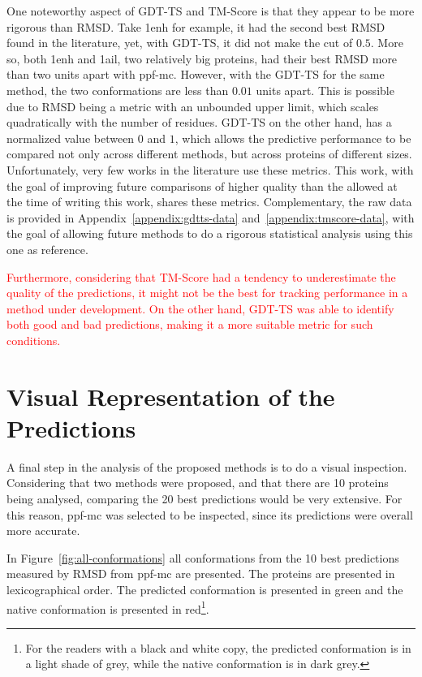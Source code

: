 One noteworthy aspect of GDT-TS and TM-Score is that they appear to be more
rigorous than RMSD. Take 1enh for example, it had the second best RMSD found
in the literature, yet, with GDT-TS, it did not make the cut of $0.5$. More so,
both 1enh and 1ail, two relatively big proteins, had their best RMSD more
than two units apart with ppf-mc. However, with the GDT-TS for the same
method, the two conformations are less than $0.01$ units apart. This is possible
due to RMSD being a metric with an unbounded upper limit, which scales
quadratically with the number of residues. GDT-TS on the other hand, has a
normalized value between $0$ and $1$, which allows the predictive performance
to be compared not only across different methods, but across proteins of different sizes.
Unfortunately, very few works in the literature use these metrics. This work,
with the goal of improving future comparisons of higher quality than the allowed
at the time of writing this work, shares these metrics. Complementary, the raw data is
provided in Appendix~\ref{appendix:gdtts-data} and~\ref{appendix:tmscore-data},
with the goal of allowing future methods to do a rigorous statistical analysis
using this one as reference.

\textcolor{red}{
Furthermore, considering that TM-Score had a tendency to underestimate the quality
of the predictions, it might not be the best for tracking performance in a
method under development. On the other hand, GDT-TS was able to identify both
good and bad predictions, making it a more suitable metric for such conditions.
}

\section{Visual Representation of the Predictions}
\label{sec:visual-analysis}

A final step in the analysis of the proposed methods is to do a visual
inspection. Considering that two methods were proposed, and that there are 10
proteins being analysed, comparing the 20 best predictions would be very
extensive. For this reason, ppf-mc was selected to be inspected, since
its predictions were overall more accurate.



In Figure~\ref{fig:all-conformations} all conformations from the 10 best
predictions measured by RMSD from ppf-mc are presented. The proteins are presented in
lexicographical order. The predicted conformation is presented in green and the
native conformation is presented in red\footnote{For the readers with a black
and white copy, the predicted conformation is in a light shade of grey, while
the native conformation is in dark grey.}.

